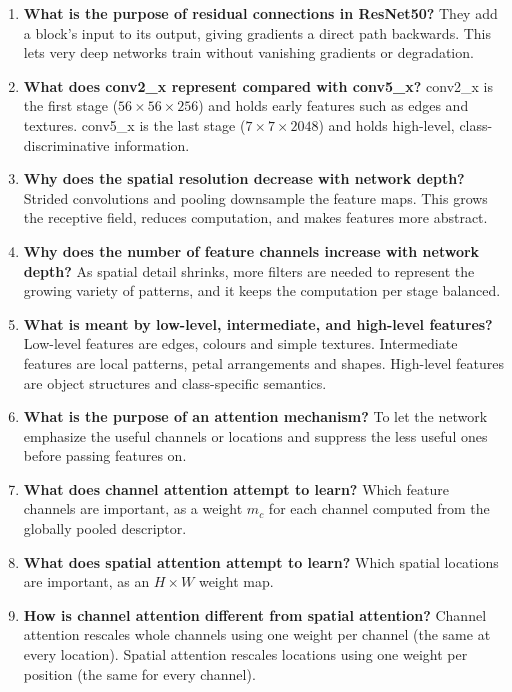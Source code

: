\documentclass[10pt]{article}
\begin{document}
\begin{enumerate}
\item \textbf{What is the purpose of residual connections in ResNet50?}
They add a block's input to its output, giving gradients a direct path
backwards. This lets very deep networks train without vanishing gradients
or degradation.

\item \textbf{What does conv2\_x represent compared with conv5\_x?}
conv2\_x is the first stage ($56\times56\times256$) and holds early
features such as edges and textures. conv5\_x is the last stage
($7\times7\times2048$) and holds high-level, class-discriminative
information.

\item \textbf{Why does the spatial resolution decrease with network depth?}
Strided convolutions and pooling downsample the feature maps. This grows
the receptive field, reduces computation, and makes features more abstract.

\item \textbf{Why does the number of feature channels increase with network depth?}
As spatial detail shrinks, more filters are needed to represent the growing
variety of patterns, and it keeps the computation per stage balanced.

\item \textbf{What is meant by low-level, intermediate, and high-level features?}
Low-level features are edges, colours and simple textures. Intermediate
features are local patterns, petal arrangements and shapes. High-level
features are object structures and class-specific semantics.

\item \textbf{What is the purpose of an attention mechanism?}
To let the network emphasize the useful channels or locations and
suppress the less useful ones before passing features on.

\item \textbf{What does channel attention attempt to learn?}
Which feature channels are important, as a weight $m_c$ for each channel
computed from the globally pooled descriptor.

\item \textbf{What does spatial attention attempt to learn?}
Which spatial locations are important, as an $H\times W$ weight map.

\item \textbf{How is channel attention different from spatial attention?}
Channel attention rescales whole channels using one weight per channel
(the same at every location). Spatial attention rescales locations using one
weight per position (the same for every channel).


\end{enumerate}
\end{document}
